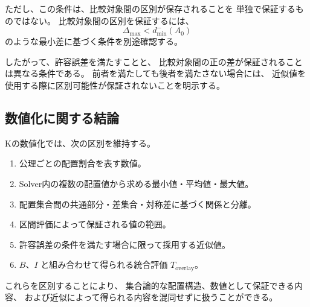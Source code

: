 \documentclass[a4paper,12pt]{article}
\begin{document}
ただし、この条件は、比較対象間の区別が保存されることを
単独で保証するものではない。
比較対象間の区別を保証するには、
\[
    \Delta_{\max}<d_{\min}^-(A_0)
\]
のような最小差に基づく条件を別途確認する。

したがって、許容誤差を満たすことと、
比較対象間の正の差が保証されることは異なる条件である。
前者を満たしても後者を満たさない場合には、
近似値を使用する際に区別可能性が保証されないことを明示する。

\subsection{数値化に関する結論}

Kの数値化では、次の区別を維持する。

\begin{enumerate}[label=(\arabic*)]
    \item 公理ごとの配置割合を表す数値。
    \item Solver内の複数の配置値から求める最小値・平均値・最大値。
    \item 配置集合間の共通部分・差集合・対称差に基づく関係と分離。
    \item 区間評価によって保証される値の範囲。
    \item 許容誤差の条件を満たす場合に限って採用する近似値。
    \item $B$、$I$ と組み合わせて得られる統合評価
    $T_{\mathrm{overlay}}$。
\end{enumerate}

これらを区別することにより、
集合論的な配置構造、数値として保証できる内容、
および近似によって得られる内容を混同せずに扱うことができる。
\end{document}
